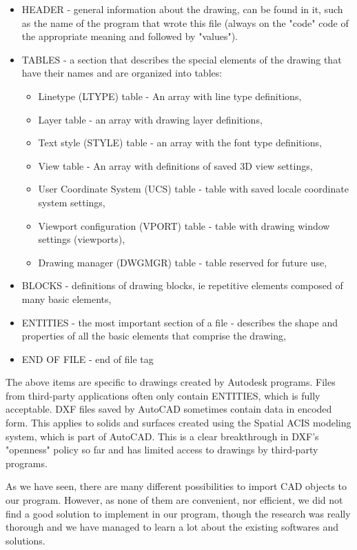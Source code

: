 \documentclass[a4paper, 11pt, article]{report}
\begin{document}
\begin{itemize}
\item HEADER - general information about the drawing, can be found in it, such as the name of the program that wrote this file (always on the "code" code of the appropriate meaning and followed by "values").
\item TABLES - a section that describes the special elements of the drawing that have their names and are organized into tables:

\begin{itemize}
\item Linetype (LTYPE) table - An array with line type definitions,
\item Layer table - an array with drawing layer definitions,
\item Text style (STYLE) table - an array with the font type definitions,
\item View table - An array with definitions of saved 3D view settings,
\item User Coordinate System (UCS) table - table with saved locale coordinate system settings,
\item Viewport configuration (VPORT) table - table with drawing window settings (viewports),
\item Drawing manager (DWGMGR) table - table reserved for future use,
\end{itemize}

\item BLOCKS - definitions of drawing blocks, ie repetitive elements composed of many basic elements,
\item ENTITIES - the most important section of a file - describes the shape and properties of all the basic elements that comprise the drawing,
\item END OF FILE - end of file tag
\end{itemize}

The above items are specific to drawings created by Autodesk programs. Files from third-party applications often only contain ENTITIES, which is fully acceptable.
DXF files saved by AutoCAD sometimes contain data in encoded form. This applies to solids and surfaces created using the Spatial ACIS modeling system, which is part of AutoCAD. This is a clear breakthrough in DXF's "openness" policy so far and has limited access to drawings by third-party programs.

As we have seen, there are many different possibilities to import CAD objects to our program. However, as none of them are convenient, nor efficient, we did not find a good solution to implement in our program, though the research was really thorough and we have managed to learn a lot about the existing softwares and solutions.
   
\end{document}
